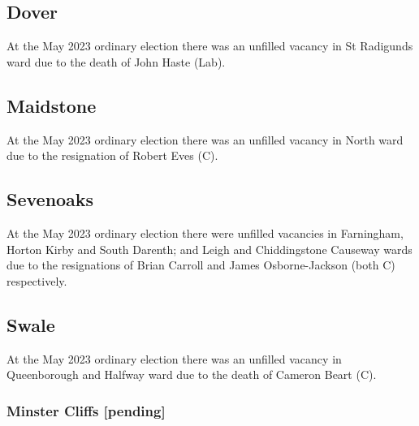 \documentclass[a4paper,openany]{book}
\begin{document}
\begin{resultsiii}
\subsection*{Dover}

At the May 2023 ordinary election there was an unfilled vacancy in St Radigunds ward due to the death of John Haste (Lab).%

\subsection*{Maidstone}

At the May 2023 ordinary election there was an unfilled vacancy in North ward due to the resignation of Robert Eves (C).%

\subsection*{Sevenoaks}

At the May 2023 ordinary election there were unfilled vacancies in Farningham, Horton Kirby and South Darenth; and Leigh and Chiddingstone Causeway wards due to the resignations of Brian Carroll and James Osborne-Jackson (both C) respectively.%
%

\subsection*{Swale}

At the May 2023 ordinary election there was an unfilled vacancy in Queenborough and Halfway ward due to the death of Cameron Beart (C).%

\subsubsection*{Minster Cliffs \hspace*{\fill}\nolinebreak[1]%
	\enspace\hspace*{\fill}
	[pending]}



\end{resultsiii}
\end{document}
